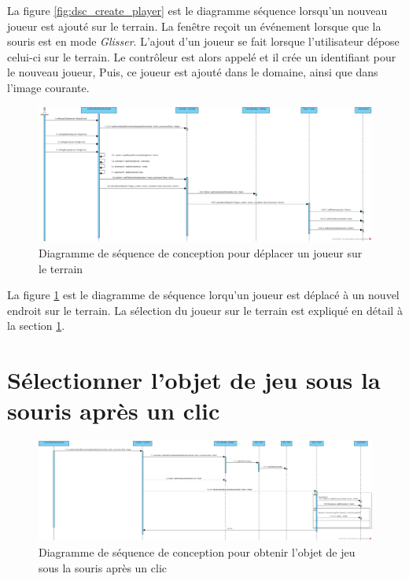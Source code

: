 La figure \ref{fig:dsc_create_player} est le diagramme séquence lorsqu'un nouveau joueur est ajouté sur le terrain.
La fenêtre reçoit un événement lorsque que la souris est en mode \textit{Glisser}.
L'ajout d'un joueur se fait lorsque l'utilisateur dépose celui-ci sur le terrain.
Le contrôleur est alors appelé et il crée un identifiant pour le nouveau joueur,
Puis, ce joueur est ajouté dans le domaine, ainsi que dans l'image courante.


\begin{figure}[htpb]
    \centering
    \includegraphics[scale=0.3]{fig/dsc_drag_player.png}
    \caption{Diagramme de séquence de conception pour déplacer un joueur sur le terrain}
    \label{fig:dsc_drag_player}
\end{figure}

La figure \ref{fig:dsc_drag_player} est le diagramme de séquence lorqu'un joueur est déplacé à un nouvel endroit sur le terrain.
La sélection du joueur sur le terrain est expliqué en détail à la section \ref{sec:convertir_clic_en_objet}.

\section{Sélectionner l'objet de jeu sous la souris après un clic}
\label{sec:convertir_clic_en_objet}

\begin{figure}[htpb]
    \centering
    \includegraphics[scale=0.27]{fig/dsc_get_game_object_by_coordinate.png}
    \caption{Diagramme de séquence de conception pour obtenir l'objet de jeu sous la souris après un clic}
    \label{fig:dsc_get_game_object}
\end{figure}

